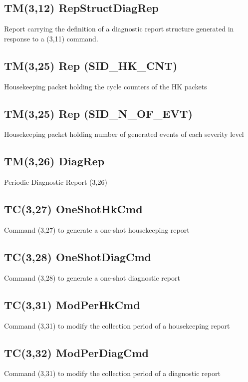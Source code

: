 \pagebreak
\subsection{TM(3,12) RepStructDiagRep}
Report carrying the definition of a diagnostic report structure generated in response to a (3,11) command.

\pagebreak
\subsection{TM(3,25) Rep (SID\_\-HK\_\-CNT)}
Housekeeping packet holding the cycle counters of the HK packets

\pagebreak
\subsection{TM(3,25) Rep (SID\_\-N\_\-OF\_\-EVT)}
Housekeeping packet holding number of generated events of each severity level

\pagebreak
\subsection{TM(3,26) DiagRep}
Periodic Diagnostic Report (3,26)

\pagebreak
\subsection{TC(3,27) OneShotHkCmd}
Command (3,27) to generate a one-shot housekeeping report

\pagebreak
\subsection{TC(3,28) OneShotDiagCmd}
Command (3,28) to generate a one-shot diagnostic report

\pagebreak
\subsection{TC(3,31) ModPerHkCmd}
Command (3,31) to modify the collection period of a housekeeping report

\pagebreak
\subsection{TC(3,32) ModPerDiagCmd}
Command (3,31) to modify the collection period of a diagnostic report

